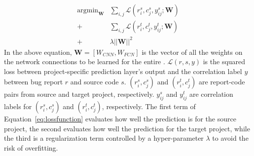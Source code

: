



\begin{equation}
\begin{aligned}
\label{eq:lossfunction}
\mathop{\arg\min}_{\mathbf{W}}&\sum_{i,j}\mathcal{L}(r^s_i,c^s_j,y^s_{ij}; \mathbf{W}) \\
+&\sum_{i,j}\mathcal{L}(r^t_i,c^t_j,y^t_{ij}; \mathbf{W}) \\
+&\lambda||\mathbf{W}||^2
\end{aligned}
\end{equation}
%
In the above equation, $\mathbf{W} = [W_{CNN}, W_{FCN}]$ is the vector of all the weights on the network connections to be learned for the entire \TRANPCNN. $\mathcal{L}(r,s,y)$ is the squared loss between project-specific prediction layer's output and the correlation label $y$ between bug report $r$ and source code $s$. $(r^s_i, c^s_j)$ and $(r^t_i, c^t_j)$ are report-code pairs from source and target project, respectively.  $y^s_{ij}$ and $y^t_{ij}$ are correlation labels for $(r^s_i, c^s_j)$ and $(r^t_i, c^t_j)$, respectively. The first term of Equation~\ref{eq:lossfunction} evaluates how well the prediction is for the source project, the second evaluates how well the prediction for the target project, while the third is a regularization term controlled by a hyper-parameter $\lambda$ to avoid the risk of overfitting.

